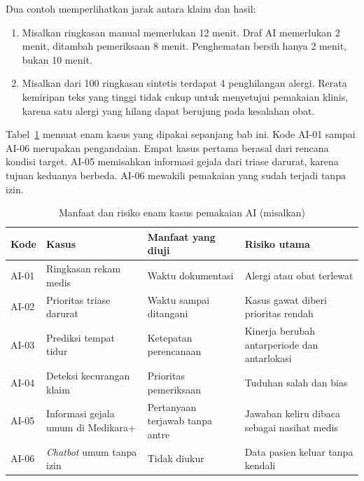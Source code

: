 Dua contoh memperlihatkan jarak antara klaim dan hasil:
\begin{enumerate}
  \item Misalkan ringkasan manual memerlukan 12 menit. Draf AI memerlukan 2 menit, ditambah
  pemeriksaan 8 menit. Penghematan bersih hanya 2 menit, bukan 10 menit.
  \item Misalkan dari 100 ringkasan sintetis terdapat 4 penghilangan alergi. Rerata kemiripan teks
  yang tinggi tidak cukup untuk menyetujui pemakaian klinis, karena satu alergi yang hilang dapat
  berujung pada kesalahan obat.
\end{enumerate}

Tabel~\ref{tab:ch11-manfaat-risiko} memuat enam kasus yang dipakai sepanjang bab ini. Kode AI-01
sampai AI-06 merupakan pengandaian. Empat kasus pertama berasal dari rencana kondisi target. AI-05
memisahkan informasi gejala dari triase darurat, karena tujuan keduanya berbeda. AI-06 mewakili
pemakaian yang sudah terjadi tanpa izin.

\begin{table}[!htb]
  \centering\small
  \caption{Manfaat dan risiko enam kasus pemakaian AI (misalkan)}\label{tab:ch11-manfaat-risiko}
  \begin{tabularx}{\textwidth}{|>{\raggedright\arraybackslash}p{}|>{\raggedright\arraybackslash}X|>{\raggedright\arraybackslash}X|>{\raggedright\arraybackslash}X|}
    \hline
    \textbf{Kode} & \textbf{Kasus} & \textbf{Manfaat yang diuji} & \textbf{Risiko utama} \\ \hline
    AI-01 & Ringkasan rekam medis & Waktu dokumentasi & Alergi atau obat terlewat \\ \hline
    AI-02 & Prioritas triase darurat & Waktu sampai ditangani & Kasus gawat diberi prioritas
    rendah \\ \hline
    AI-03 & Prediksi tempat tidur & Ketepatan perencanaan & Kinerja berubah antarperiode dan
    antarlokasi \\ \hline
    AI-04 & Deteksi kecurangan klaim & Prioritas pemeriksaan & Tuduhan salah dan bias \\ \hline
    AI-05 & Informasi gejala umum di Medikara+ & Pertanyaan terjawab tanpa antre & Jawaban keliru
    dibaca sebagai nasihat medis \\ \hline
    AI-06 & \textit{Chatbot} umum tanpa izin & Tidak diukur & Data pasien keluar tanpa kendali \\
    \hline
  \end{tabularx}
\end{table}

